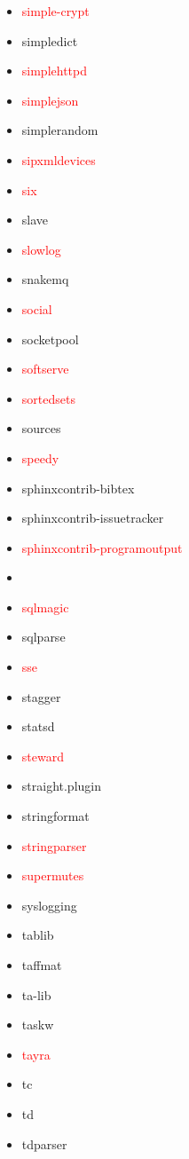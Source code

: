\documentclass{l4proj}
\begin{document}
\begin{appendices}
{\begin{itemize}
\item\textcolor{red}{simple-crypt}
\item simpledict
\item\textcolor{red}{simplehttpd}
\item\textcolor{red}{simplejson}
\item simplerandom
\item\textcolor{red}{sipxmldevices}
\item\textcolor{red}{six}
\item slave
\item\textcolor{red}{slowlog}
\item snakemq
\item\textcolor{red}{social}
\item socketpool
\item\textcolor{red}{softserve}
\item\textcolor{red}{sortedsets}
\item sources
\item\textcolor{red}{speedy}
\item sphinxcontrib-bibtex
\item sphinxcontrib-issuetracker
\item\textcolor{red}{sphinxcontrib-programoutput}
\item {}
\item\textcolor{red}{sqlmagic}
\item sqlparse
\end{itemize}
}%
\noindent\parbox[t]{0.32\textwidth}{\raggedright%
\begin{itemize}
\item\textcolor{red}{sse}
\item stagger
\item statsd
\item\textcolor{red}{steward}
\item straight.plugin
\item stringformat
\item\textcolor{red}{stringparser}
\item\textcolor{red}{supermutes}
\item syslogging
\item tablib
\item taffmat
\item ta-lib
\item taskw
\item\textcolor{red}{tayra}
\item tc
\item td
\item tdparser

\end{itemize}}
\end{appendices}
\end{document}
